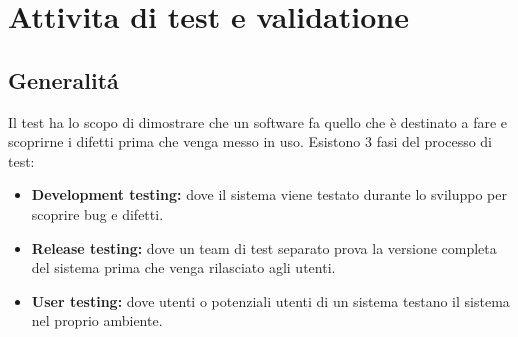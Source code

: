 \documentclass[a4paper,12pt,openany,oneside]{book}
\begin{document}
\chapter{Attivita di test e validatione}
\section{Generalitá}
Il test ha lo scopo di dimostrare che un software fa quello che è destinato a fare e scoprirne i difetti prima che venga messo in uso. 
Esistono 3 fasi del processo di test:
\begin{itemize}
  \item \textbf{Development testing: }dove il sistema viene testato durante lo sviluppo per scoprire bug e difetti.
  \item \textbf{Release testing: }dove un team di test separato prova la versione completa del sistema prima che venga rilasciato agli utenti.
    \item \textbf{User testing: }dove utenti o potenziali utenti di un sistema testano il sistema nel proprio ambiente.
\end{itemize}
\end{document}

